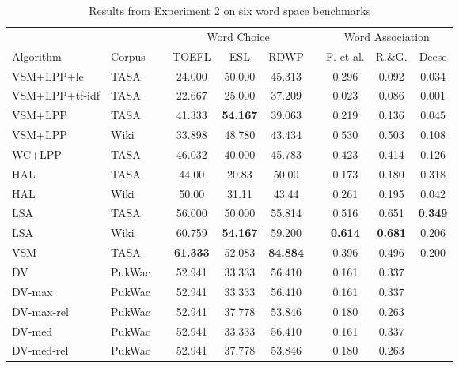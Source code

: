\documentclass[11pt]{article}
\begin{document}
\begin{table*}[hbt!f]
  \center
  \small
    \begin{tabular}{l l r ccc r ccc }
      \toprule
      & & &  \multicolumn{3}{c}{Word Choice} & &
      \multicolumn{3}{c}{Word Association} \\
      \cmidrule{4-6} \cmidrule{8-10}
      Algorithm & Corpus && TOEFL & ESL   & RDWP & & F. et al. & R.\&G. & Deese \\
      \midrule
      VSM+LPP+le & TASA  &&  24.000  &  50.000  &  45.313  &&
      0.296  &  0.092  & 0.034 \\

      VSM+LPP+tf-idf & TASA  && 22.667  &  25.000  &  37.209  &&
      0.023  &  0.086  & 0.001 \\

      VSM+LPP    & TASA  && 41.333  &  {\bf 54.167}  &  39.063  &&
      0.219  &  0.136  & 0.045 \\

      VSM+LPP   & Wiki  && 33.898  &  48.780  &  43.434  &&
      0.530  &  0.503  & 0.108 \\

      WC+LPP    & TASA && 46.032 & 40.000 & 45.783 && 
      0.423 & 0.414  & 0.126 \\

      HAL       & TASA  &&  44.00  &  20.83  &  50.00  &&  0.173  &  0.180 & 0.318 \\
      HAL       & Wiki  &&  50.00  &  31.11  &  43.44  &&  0.261  &  0.195 & 0.042 \\

      LSA       & TASA  && 56.000 &  50.000  &  55.814  &&
      0.516  &  0.651  & {\bf 0.349} \\

      LSA       & Wiki  && 60.759  &  {\bf 54.167}  &  59.200  &&
      {\bf 0.614} &  {\bf 0.681} & 0.206 \\

      VSM       & TASA  && {\bf 61.333}  &  52.083  &  {\bf 84.884}  &&
      0.396  &  0.496  & 0.200 \\

      DV & PukWac && 
      52.941  &  33.333  &  56.410  && 0.161  &  0.337  & \\
      DV-max & PukWac &&
      52.941  &  33.333  &  56.410  && 0.161  &  0.337  & \\
      DV-max-rel & PukWac &&
      52.941  &  37.778  &  53.846  && 0.180  &  0.263  & \\
      DV-med & PukWac && 
      52.941  &  33.333  &  56.410  &&  0.161  &  0.337  & \\
      DV-med-rel & PukWac &&
      52.941  &  37.778  &  53.846  &&  0.180  &  0.263  & \\

      \bottomrule
    \end{tabular}
  \caption{Results from Experiment 2 on six word space benchmarks}
  \label{tab:exp3}
\end{table*}
\end{document}
